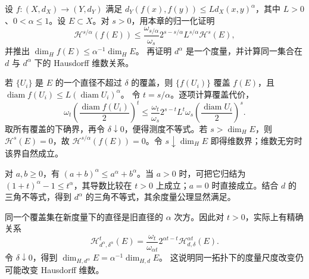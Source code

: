 \BookExercises

\begin{exercise}\label{g3:ex:holder-hausdorff-dimension}
	设 \(f:(X,d_X)\to(Y,d_Y)\) 满足
	\(d_Y(f(x),f(y))\le Ld_X(x,y)^\alpha\)，其中 \(L>0\)、\(0<\alpha\le1\)。设 \(E\subset X\)。对 \(s>0\)，用本章的归一化证明
	\[
		\mathcal H^{s/\alpha}(f(E))
		\le \frac{\omega_{s/\alpha}}{\omega_s}
		2^{s-s/\alpha}L^{s/\alpha}\mathcal H^s(E),
	\]
	并推出 \(\dim_H f(E)\le\alpha^{-1}\dim_HE\)。
	再证明 \(d^\alpha\) 是一个度量，并计算同一集合在 \(d\) 与 \(d^\alpha\) 下的 Hausdorff 维数关系。
\end{exercise}
\begin{solution}
	若 \(\{U_i\}\) 是 \(E\) 的一个直径不超过 \(\delta\) 的覆盖，则 \(\{f(U_i)\}\) 覆盖 \(f(E)\)，且
	\(\operatorname{diam}f(U_i)\le L(\operatorname{diam}U_i)^\alpha\)。
	令 \(t=s/\alpha\)。逐项计算覆盖代价，
	\[
		\omega_t\left(\frac{\operatorname{diam}f(U_i)}2\right)^t
		\le\frac{\omega_t}{\omega_s}2^{s-t}L^t
		\omega_s\left(\frac{\operatorname{diam}U_i}2\right)^s.
	\]
	取所有覆盖的下确界，再令 \(\delta\downarrow0\)，便得测度不等式。若 \(s>\dim_HE\)，则 \(\mathcal H^s(E)=0\)，故
	\(\mathcal H^{s/\alpha}(f(E))=0\)。令 \(s\downarrow\dim_HE\) 即得维数界；维数无穷时该界自然成立。

	对 \(a,b\ge0\)，有 \((a+b)^\alpha\le a^\alpha+b^\alpha\)。当 \(a>0\) 时，可把它归结为
	\((1+t)^\alpha-1\le t^\alpha\)，其导数比较在 \(t>0\) 上成立；\(a=0\) 时直接成立。结合 \(d\) 的三角不等式，得到 \(d^\alpha\) 的三角不等式，其余度量公理显然满足。

	同一个覆盖集在新度量下的直径是旧直径的 \(\alpha\) 次方。因此对 \(t>0\)，实际上有精确关系
	\[
		\mathcal H^t_{d^\alpha,\delta^\alpha}(E)
		=\frac{\omega_t}{\omega_{\alpha t}}2^{\alpha t-t}
		\mathcal H^{\alpha t}_{d,\delta}(E).
	\]
	令 \(\delta\downarrow0\)，得到
	\(\dim_{H,d^\alpha}E=\alpha^{-1}\dim_{H,d}E\)。
	这说明同一拓扑下的度量尺度改变仍可能改变 Hausdorff 维数。
\end{solution}

